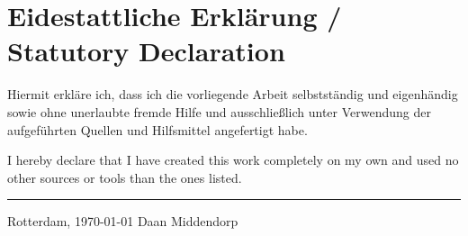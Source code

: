 \chapter*{\LARGE Eidestattliche Erklärung / Statutory Declaration}
Hiermit erkläre ich, dass ich die vorliegende Arbeit selbstständig und eigenhändig sowie ohne unerlaubte fremde Hilfe und ausschließlich unter Verwendung der aufgeführten Quellen und Hilfsmittel angefertigt habe.
\vspace{2em}

\noindent I hereby declare that I have created this work completely on my own and used no other sources or tools than the ones listed.

\vspace{30 mm}
\begin{flushright}

\rule{90mm}{1pt}

Rotterdam, \today \hspace{15 mm} Daan Middendorp
\end{flushright}